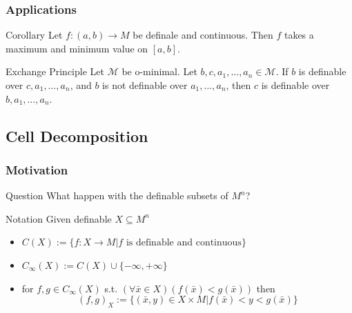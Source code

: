 \begin{frame}[c]\frametitle{Applications}	
    
	\begin{block}{Corollary}
		Let $f:(a,b) \to M$ be definale and continuous. Then $f$ takes a maximum and minimum value on $[a,b]$.
	\end{block}

	\begin{block}{Exchange Principle \citep{pillay1986definable}}
		Let $\mathcal{M}$ be o-minimal.
		Let $b,c,a_1,\ldots,a_n \in \mathcal{M}$.
		If $b$ is definable over $c,a_1,\ldots,a_n$, and $b$ is not definable over $a_1,\ldots,a_n$, then $c$ is definable over $b,a_1,\ldots,a_n$.
	\end{block}

\end{frame}

\subsection{Cell Decomposition}

\begin{frame}[c]\frametitle{Motivation}
	
	\begin{beamerboxesrounded}[shadow=true, upper=question]{Question}
		What happen with the definable subsets of $M^n$?
	\end{beamerboxesrounded}
    
	\begin{beamerboxesrounded}[shadow=true]{Notation}
		Given definable $X \subseteq M^n$
		\begin{itemize}
			\item $C(X):= \{ f:X \to M|f \text{ is definable and continuous}\}$
			\item $C_\infty(X):=C(X) \cup \{ -\infty, +\infty \}$
			\item for $f,g \in C_\infty(X)$ s.t. $(\forall \bar{x} \in X)(f(\bar{x})<g(\bar{x}))$ then 
			$$(f,g)_X := \{  (\bar{x},y)\in X \times M|f(\bar{x})<y<g(\bar{x})\}$$
		\end{itemize}
	\end{beamerboxesrounded}

\end{frame}

